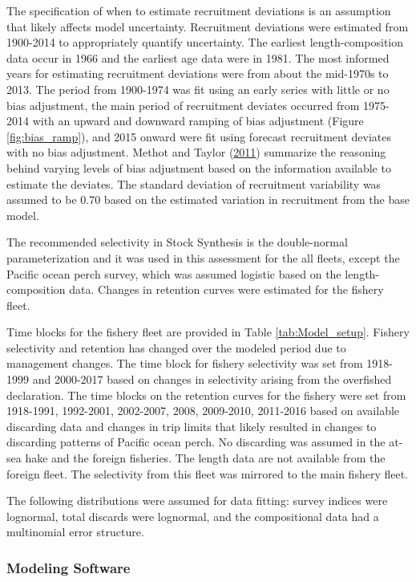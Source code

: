 \documentclass[12pt,]{article}
\begin{document}
The specification of when to estimate recruitment deviations is an
assumption that likely affects model uncertainty. Recruitment deviations
were estimated from 1900-2014 to appropriately quantify uncertainty. The
earliest length-composition data occur in 1966 and the earliest age data
were in 1981. The most informed years for estimating recruitment
deviations were from about the mid-1970s to 2013. The period from
1900-1974 was fit using an early series with little or no bias
adjustment, the main period of recruitment deviates occurred from
1975-2014 with an upward and downward ramping of bias adjustment (Figure
\ref{fig:bias_ramp}), and 2015 onward were fit using forecast
recruitment deviates with no bias adjustment. Methot and Taylor
(\protect\hyperlink{ref-methot_adjusting_2011}{2011}) summarize the
reasoning behind varying levels of bias adjustment based on the
information available to estimate the deviates. The standard deviation
of recruitment variability was assumed to be 0.70 based on the estimated
variation in recruitment from the base model.

The recommended selectivity in Stock Synthesis is the double-normal
parameterization and it was used in this assessment for the all fleets,
except the Pacific ocean perch survey, which was assumed logistic based
on the length-composition data. Changes in retention curves were
estimated for the fishery fleet.

Time blocks for the fishery fleet are provided in Table
\ref{tab:Model_setup}. Fishery selectivity and retention has changed
over the modeled period due to management changes. The time block for
fishery selectivity was set from 1918-1999 and 2000-2017 based on
changes in selectivity arising from the overfished declaration. The time
blocks on the retention curves for the fishery were set from 1918-1991,
1992-2001, 2002-2007, 2008, 2009-2010, 2011-2016 based on available
discarding data and changes in trip limits that likely resulted in
changes to discarding patterns of Pacific ocean perch. No discarding was
assumed in the at-sea hake and the foreign fisheries. The length data
are not available from the foreign fleet. The selectivity from this
fleet was mirrored to the main fishery fleet.

The following distributions were assumed for data fitting: survey
indices were lognormal, total discards were lognormal, and the
compositional data had a multinomial error structure.

\subsubsection{Modeling Software}\label{modeling-software}
\end{document}
